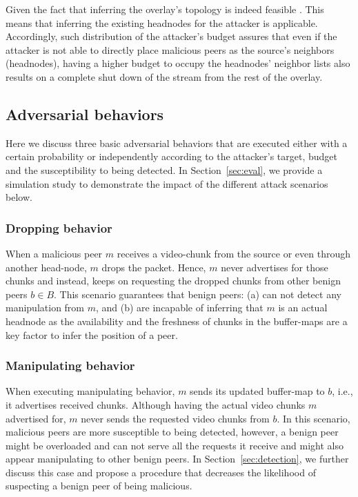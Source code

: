 Given the fact that inferring the overlay's topology is indeed feasible \cite{nguyen2016swap,rbcs} .
This means that inferring the existing headnodes for the attacker is applicable.
Accordingly, such distribution of the attacker's budget assures that even if the attacker is not able to directly place malicious peers as the source's neighbors (headnodes), having a higher budget to occupy the headnodes' neighbor lists also results on a complete shut down of the stream from the rest of the overlay.

\subsection{Adversarial behaviors}
Here we discuss three basic adversarial behaviors that are executed either with a certain probability or independently according to the attacker's target, budget and the susceptibility to being detected.
In Section~\ref{sec:eval}, we provide a simulation study to demonstrate the impact of the different attack scenarios below.

\subsubsection*{Dropping behavior}
When a malicious peer $m$ receives a video-chunk from the source or even through another head-node, $m$ drops the packet. 
Hence, $m$ never advertises for those chunks and instead, keeps on requesting the dropped chunks from other benign peers $b \in B$.
This scenario guarantees that benign peers: (a) can not detect any manipulation from $m$, and (b) are incapable of inferring that $m$ is an actual headnode as the availability and the freshness of chunks in the buffer-maps are a key factor to infer the position of a peer.

\subsubsection*{Manipulating behavior}
When executing manipulating behavior, $m$ sends its updated buffer-map to $b$, i.e., it advertises received chunks. 
Although having the actual video chunks $m$ advertised for, $m$ never sends the requested video chunks from $b$.
In this scenario, malicious peers are more susceptible to being detected, however, a benign peer might be overloaded and can not serve all the requests it receive and might also appear manipulating to other benign peers.
In Section~\ref{sec:detection}, we further discuss this case and propose a procedure that decreases the likelihood of suspecting a benign peer of being malicious.

